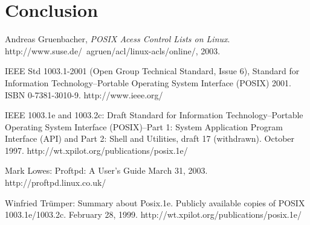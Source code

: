 
\section*{Conclusion}

\begin{thebibliography}{9}
 
  Andreas Gruenbacher,
  \emph{POSIX Acess Control Lists on Linux}.
  http://www.suse.de/~agruen/acl/linux-acls/online/,
  2003.

    IEEE Std 1003.1-2001 (Open Group Technical Standard, Issue 6), 
	Standard for Information Technology--Portable Operating System Interface (POSIX) 2001. 
	ISBN 0-7381-3010-9. 
	http://www.ieee.org/

    IEEE 1003.1e and 1003.2c: Draft Standard for Information Technology--Portable Operating System Interface (POSIX)--Part 1: System Application Program Interface (API) and Part 2: Shell and Utilities, draft 17 (withdrawn). 
	October 1997. 
	http://wt.xpilot.org/publications/posix.1e/

	Mark Lowes: 
	Proftpd: 
	A User's Guide March 31, 2003. 
	http://proftpd.linux.co.uk/

    Winfried Trümper: Summary about Posix.1e. Publicly available copies of POSIX 1003.1e/1003.2c. February 28, 1999. http://wt.xpilot.org/publications/posix.1e/

\end{thebibliography}

